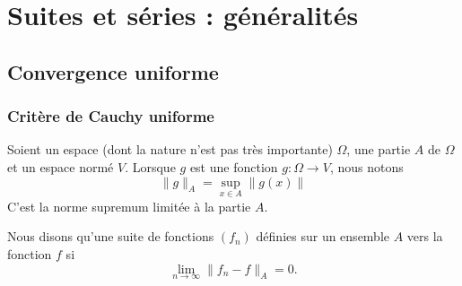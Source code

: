 
\section{Suites et séries : généralités}
\label{SECooTDZNooJvjPks}

\subsection{Convergence uniforme}

\subsubsection{Critère de Cauchy uniforme}

\begin{definition}
    Soient un espace (dont la nature n'est pas très importante) \( \Omega\), une partie \( A\) de \( \Omega\) et un espace normé \( V\). Lorsque \( g\) est une fonction \( g\colon \Omega\to V\), nous notons
    \begin{equation}
    \| g \|_A=\sup_{x\in A}\| g(x) \|
    \end{equation}
    C'est la norme supremum limitée à la partie \( A\).

    Nous disons qu'une suite de fonctions \( (f_n)\) définies sur un ensemble \( A\)  vers la fonction \( f\) si
    \begin{equation}
        \lim_{n\to \infty} \| f_n-f \|_A=0.
    \end{equation}
\end{definition}

